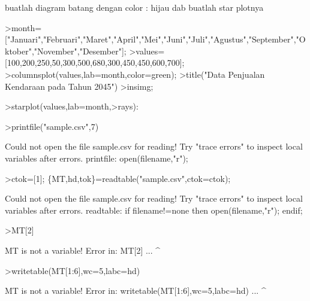 \documentclass[a4paper,10pt]{article}
\begin{document}
\begin{eulernotebook}
\begin{eulercomment}
\begin{eulercomment}
\begin{eulercomment}
\begin{eulercomment}
\begin{eulercomment}
\begin{eulercomment}
\begin{eulercomment}
\begin{eulercomment}
\begin{eulercomment}
\begin{eulercomment}
\begin{eulercomment}
\begin{eulercomment}
\begin{eulercomment}
\begin{eulercomment}
\begin{eulercomment}
\begin{eulercomment}
\begin{eulercomment}
\begin{eulercomment}
\begin{eulercomment}
\begin{eulercomment}
\begin{eulercomment}
\begin{eulercomment}
\begin{eulercomment}
\begin{eulercomment}
\begin{eulercomment}
buatlah diagram batang dengan color : hijau dab buatlah star plotnya
\end{eulercomment}
\begin{eulerprompt}
>month=["Januari","Februari","Maret","April","Mei","Juni","Juli","Agustus","September","Oktober","November","Desember"];
>values=[100,200,250,50,300,500,680,300,450,450,600,700];
>columnsplot(values,lab=month,color=green);
>title("Data Penjualan Kendaraan pada Tahun 2045")
>insimg;
\end{eulerprompt}
\begin{eulerprompt}
>starplot(values,lab=month,>rays):
\end{eulerprompt}
\begin{eulerprompt}
>printfile("sample.csv",7)
\end{eulerprompt}
\begin{euleroutput}
  Could not open the file
  sample.csv
  for reading!
  Try "trace errors" to inspect local variables after errors.
  printfile:
      open(filename,"r");
\end{euleroutput}
\begin{eulerprompt}
>ctok=[1]; \{MT,hd,tok\}=readtable("sample.csv",ctok=ctok);
\end{eulerprompt}
\begin{euleroutput}
  Could not open the file
  sample.csv
  for reading!
  Try "trace errors" to inspect local variables after errors.
  readtable:
      if filename!=none then open(filename,"r"); endif;
\end{euleroutput}
\begin{eulerprompt}
>MT[2]
\end{eulerprompt}
\begin{euleroutput}
  MT is not a variable!
  Error in:
  MT[2] ...
       ^
\end{euleroutput}
\begin{eulerprompt}
>writetable(MT[1:6],wc=5,labc=hd)
\end{eulerprompt}
\begin{euleroutput}
  MT is not a variable!
  Error in:
  writetable(MT[1:6],wc=5,labc=hd) ...
                    ^

\end{euleroutput}
\end{eulercomment}
\end{eulercomment}
\end{eulercomment}
\end{eulercomment}
\end{eulercomment}
\end{eulercomment}
\end{eulercomment}
\end{eulercomment}
\end{eulercomment}
\end{eulercomment}
\end{eulercomment}
\end{eulercomment}
\end{eulercomment}
\end{eulercomment}
\end{eulercomment}
\end{eulercomment}
\end{eulercomment}
\end{eulercomment}
\end{eulercomment}
\end{eulercomment}
\end{eulercomment}
\end{eulercomment}
\end{eulercomment}
\end{eulercomment}
\end{eulernotebook}
\end{document}
